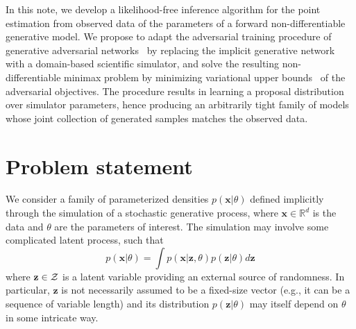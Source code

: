 \documentclass[twocolumn,superscriptaddress,aps]{revtex4-1}
\theoremstyle{plain}
\begin{document}
In this note, we develop a likelihood-free inference algorithm for the point
estimation from observed data of the parameters of a forward non-differentiable
generative model. We propose to adapt the adversarial
training procedure of generative adversarial
networks~\cite{goodfellow2014generative} by replacing the implicit generative
network with a domain-based scientific simulator, and solve the resulting
non-differentiable minimax problem by minimizing variational upper
bounds~\citep{2011arXiv1106.4487W,2012arXiv1212.4507S} of the adversarial
objectives. The procedure results in learning a proposal distribution over
simulator parameters, hence producing an arbitrarily tight family of models whose
joint collection of generated samples matches the observed data.



\section{Problem statement}
\label{sec:problem}

We consider a family of parameterized densities $p(\mathbf{x}|\theta)$
defined implicitly through the simulation of a stochastic generative process,
where $\mathbf{x} \in \mathbb{R}^d$ is the data and $\theta$ are the
parameters of interest. The simulation may involve some complicated latent
process, such that
\begin{equation}\label{eqn:p_x}
    p(\mathbf{x}|\theta) = \int p(\mathbf{x}|\mathbf{z},\theta) p(\mathbf{z}|\theta) d\mathbf{z}
\end{equation}
where $\mathbf{z} \in {\cal Z}$ is a latent variable providing an external
source of randomness. In particular, $\mathbf{z}$ is not necessarily assumed to
be a fixed-size vector (e.g., it can be a sequence of variable length) and its
distribution $p(\mathbf{z}|\theta)$ may itself depend on $\theta$ in some intricate way.
\end{document}
